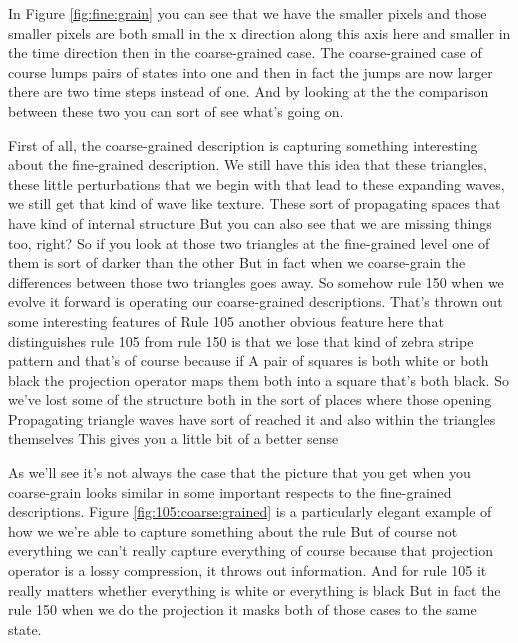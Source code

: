 \documentclass[]{article}
\begin{document}
In Figure \ref{fig:fine:grain} you can see that we have the smaller pixels and those smaller pixels are both small in the x direction along this axis here and smaller in the time direction then in the coarse-grained case.
The coarse-grained case of course lumps pairs of states into one and then in fact the jumps are now larger there are two time steps instead of one.
And by looking at the the comparison between these two
you can sort of see what's going on.

First of all, the coarse-grained description is capturing something interesting about the fine-grained description.
We still have this idea that these triangles, these little perturbations that we begin with that lead to these expanding waves,  we still get that kind of wave like texture.
These sort of propagating spaces that have kind of internal structure
But you can also see that we are missing things too, right?
So if you look at those two triangles at the fine-grained level
one of them is sort of darker than the other
But in fact when we coarse-grain the differences
between those two triangles goes away.
So somehow rule 150
when we evolve it forward is
operating our coarse-grained descriptions.
That's thrown out some interesting features of Rule 105
another obvious feature here that
distinguishes rule 105 from rule 150
is that we lose that kind of zebra
stripe pattern
and that's of course because if
A pair of squares is both white
or both black
the projection operator maps them both
into a square that's both black.
So we've lost some of the structure
both in the sort of places
where those opening
Propagating triangle waves have
sort of reached it
and also within the triangles themselves
This gives you a little bit of a better sense

As we'll see it's not always the case that the picture that you get when you coarse-grain looks similar in some important respects to the fine-grained descriptions.
Figure \ref{fig:105:coarse:grained} is a particularly elegant example
of how we we're able to capture something about the rule
But of course not everything
we can't really capture everything of course
because that projection operator
is a lossy compression,
it throws out information.
And for rule 105 it really matters
whether everything is white or everything is black
But in fact the rule 150 when
we do the projection
it masks both of those cases to the same state.
\end{document}
